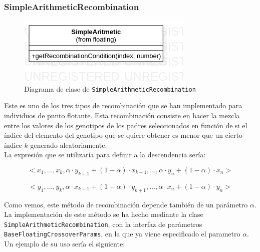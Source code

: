\subsubsection{SimpleArithmeticRecombination}

\begin{figure}[ht]
    \centering
    \includegraphics[scale=0.7]{mem/images/cap-4/4.2.6(Crossover)/SimpleArithmetic.png}
    \caption{Diagrama de clase de \texttt{SimpleArithmeticRecombination}}
    \label{fig:my_label}
\end{figure}


Este es uno de los tres tipos de recombinación que se han implementado para individuos de punto flotante. Esta recombinación consiste en hacer la mezcla entre los valores de los genotipos de los padres seleccionados en función de si el índice del elemento del genotipo que se quiere obtener es menor que un cierto índice $k$ generado aleatoriamente. \\

La expresión que se utilizaría para definir a la descendencia sería:

\begin{equation}
    <x_1, \dots, x_k, \alpha \cdot y_{k+1} + (1 - \alpha) \cdot x_{k+1}, \dots, \alpha \cdot y_n + (1 - \alpha) \cdot x_n >
\end{equation}

\begin{equation}
    <y_1, \dots, y_k, \alpha \cdot x_{k+1} + (1 - \alpha) \cdot y_{k+1}, \dots, \alpha \cdot x_n + (1 - \alpha) \cdot y_n >
\end{equation}

Como vemos, este método de recombinación depende también de un parámetro $\alpha$. \\

La implementación de este método se ha hecho mediante la clase \texttt{SimpleArithmeticRecombination}, con la interfaz de parámetros \texttt{BaseFloatingCrossoverParams}, en la que ya viene especificado el parametro $\alpha$. \\

Un ejemplo de su uso sería el siguiente:

